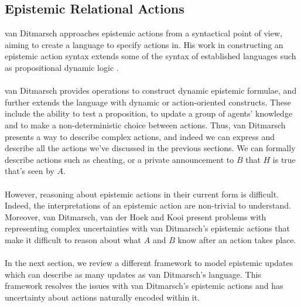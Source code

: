 \subsection{Epistemic Relational Actions} \label{epi_acts}
van Ditmarsch approaches epistemic actions from a syntactical point of view,
aiming to create a language to specify actions in.
His work in constructing an epistemic action syntax extends some of the
syntax of established languages such as propositional dynamic
logic \cite{ditmarsch99knowledge,ditmarsch2002dga}.\\
\\
van Ditmarsch provides operations to construct dynamic epistemic formulae, and
further extends the language with dynamic or action-oriented constructs.
These include the ability to test a proposition, to update a group of agents'
knowledge and to make a non-deterministic choice between actions.
Thus, van Ditmarsch presents a way to describe complex actions, and indeed we can
express and describe all the actions we've discussed in the previous sections.
We can formally describe actions such as cheating, or a private
announcement to $B$ that $H$ is true that's seen by $A$.\\
\\
However, reasoning about epistemic actions in their current form is difficult.
Indeed, the interpretations of an epistemic action are non-trivial to
understand.
Moreover, van Ditmarsch, van der Hoek and Kooi present problems with
representing complex uncertainties with van Ditmarsch's epistemic actions that make it difficult
to reason about what $A$ and $B$ know after an action takes place.\\
\\
In the next section, we review a different framework to model epistemic updates
which can describe as many updates as van Ditmarsch's language.
This framework resolves the issues with van Ditmarsch's epistemic actions and
has uncertainty about actions naturally encoded within it.
